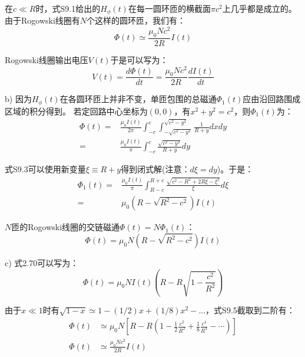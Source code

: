 在$c\ll R$时，式S9.1给出的$H_\phi(t)$在每一圆环匝的横截面$\pi c^2$上几乎都是成立的。
由于Rogowski线圈有$N$个这样的圆环匝，我们有：
\begin{equation*}
\Phi(t)\simeq \frac{\mu_0 N c^2}{2R}I(t)  \tag{2.69}
\end{equation*}

Rogowski线圈输出电压$V(t)$于是可以写为：
\begin{equation*}
V(t)=\frac{d\Phi(t)}{dt}=\frac{\mu_0 N c^2}{2R}\frac{dI(t)}{dt}  \tag{S9.2}
\end{equation*}

b) 因为$H_\phi (t)$在各圆环匝上并非不变，单匝包围的总磁通$\Phi_1(t)$应由沿回路围成区域的积分得到。
若定回路中心坐标为$(0,0)$，有$x^2+y^2=c^2$，则$\Phi_1(t)$为：
\begin{align}
\Phi (t)=&\frac{\mu_0 I(t)}{2\pi}\int_{-c}^{c}\int_{-\sqrt{c^2-y^2}}^{\sqrt{c^2-y^2}}\frac{1}{R+y}dxdy\nonumber\\
=&\frac{\mu_0 I(t)}{\pi}\int_{-c}^{c}\frac{\sqrt{c^2-y^2}}{R+y}dy\nonumber\tag{S9.3}
\end{align}

式S9.3可以使用新变量$\xi\equiv R+y$得到闭式解(注意：$d\xi=dy$)。于是：
\begin{align}
\Phi_1 (t)=&\frac{\mu_0 I(t)}{\pi} \int_{R-c}^{R+c}\frac{\sqrt{c^2-R^2+2R\xi-\xi^2}}{\xi}d\xi\nonumber\\
=&\mu_0(R-\sqrt{R^2-c^2})I(t)\nonumber\tag{S9.4}
\end{align}

$N$匝的Rogowski线圈的交链磁通$\Phi(t)=N\Phi_1(t)$：
\begin{equation*}
\Phi (t)=\mu_0 N(R-\sqrt{R^2-c^2})I(t) \tag{2.70}
\end{equation*}

c) 式2.70可以写为：
\begin{equation*}
\Phi (t)=\mu_0 NI(t)\left(R-R\sqrt{1-\frac{c^2}{R^2}}\right) \tag{S9.5}
\end{equation*}

由于$x\ll 1$时有$\sqrt{1-x}\simeq 1-(1/2)x+(1/8)x^2-...$，式S9.5截取到二阶有：
\begin{align}
\Phi(t)&\simeq\mu_0 N\left[R-R\left(1-\frac{1}{2}\frac{c^2}{R^2}+\frac{1}{8}\frac{c^4}{R^4}-\cdots\right)\right]\nonumber\tag{S9.6}\\
\Phi (t)&\simeq \frac{\mu_0 Nc^2}{2R} I(t)\nonumber\tag{2.69}
\end{align}

